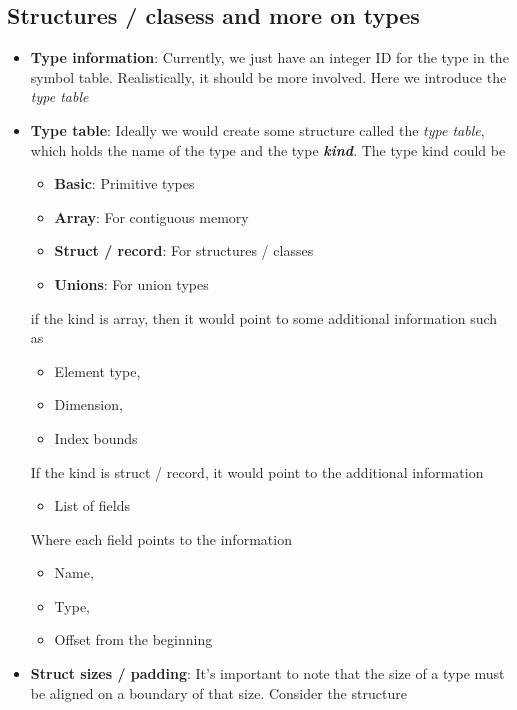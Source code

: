 \documentclass{report}
\begin{document}
        \subsection{Structures / clasess and more on types}
        \begin{itemize}
            \item \textbf{Type information}: Currently, we just have an integer ID for the type in the symbol table. Realistically, it should be more involved. Here we introduce the \textit{type table}
            \item \textbf{Type table}: Ideally we would create some structure called the \textit{type table}, which holds the name of the type and the type \textit{\textbf{kind}}. The type kind could be
                \begin{itemize}
                    \item \textbf{Basic}: Primitive types
                    \item \textbf{Array}: For contiguous memory
                    \item \textbf{Struct / record}: For structures / classes
                    \item \textbf{Unions}: For union types
                \end{itemize}
                if the kind is array, then it would point to some additional information such as
                \begin{itemize}
                    \item Element type,
                    \item Dimension, 
                    \item Index bounds
                \end{itemize}
                If the kind is struct / record, it would point to the additional information
                \begin{itemize}
                    \item List of fields
                \end{itemize}
                Where each field points to the information
                \begin{itemize}
                    \item Name,
                    \item Type, 
                    \item Offset from the beginning
                \end{itemize}
            \item \textbf{Struct sizes / padding}: It's important to note that the size of a type must be aligned on a boundary of that size. Consider the structure

\end{itemize}
\end{document}
